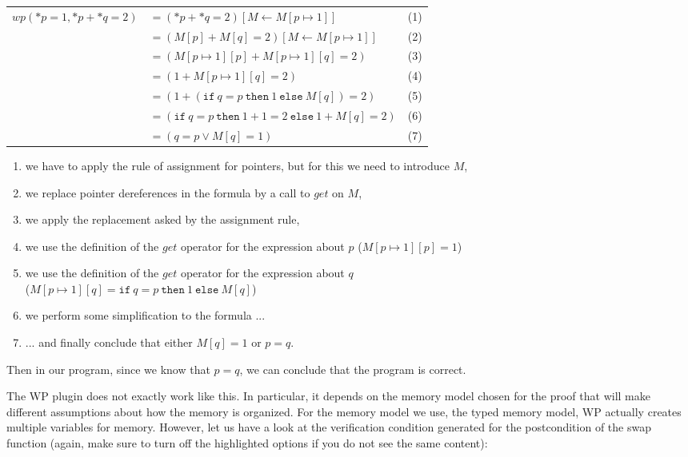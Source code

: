 \begin{tabular}{lll}
  $wp(*p = 1, *p + *q = 2)$
  & $= (*p + *q = 2)[M \leftarrow M[p \mapsto 1]]$ & (1)\\
  & $= (M[p] + M[q] = 2)[M \leftarrow M[p \mapsto 1]]$ & (2)\\
  & $= (M[p \mapsto 1][p] + M[p \mapsto 1][q] = 2)$ & (3)\\
  & $= (1 + M[p \mapsto 1][q] = 2)$ & (4)\\
  & $= (1 + (\texttt{if}\ q = p\ \texttt{then}\ 1\ \texttt{else}\ M[q]) = 2)$ & (5)\\
  & $= (\texttt{if}\ q = p\ \texttt{then}\ 1+1 = 2\ \texttt{else}\ 1+M[q] = 2)$ & (6)\\
  & $= (q = p \vee M[q] = 1)$ & (7)
\end{tabular}
\begin{enumerate}
\item we have to apply the rule of assignment for pointers, but for this we need
  to introduce $M$,
\item we replace pointer dereferences in the formula by a call to $get$ on $M$,
\item we apply the replacement asked by the assignment rule,
\item we use the definition of the $get$ operator for the expression about $p$
  ($M[p \mapsto 1][p] = 1$)
\item we use the definition of the $get$ operator for the expression about $q$\\
  ($M[p \mapsto 1][q] = \texttt{if}\ q = p\ \texttt{then}\ 1\ \texttt{else}\ M[q]$)
\item we perform some simplification to the formula ...
\item ... and finally conclude that either $M[q] = 1$ or $p = q$.
\end{enumerate}


Then in our program, since we know that $p = q$, we can conclude that the program
is correct.


The WP plugin does not exactly work like this. In particular, it depends on the
memory model chosen for the proof that will make different assumptions about how the
memory is organized. For the memory model we use, the typed memory model,
WP actually creates multiple variables for memory. However, let us have a look at
the verification condition generated for the postcondition of the swap function
(again, make sure to turn off the highlighted options if you do not see the same
content):


